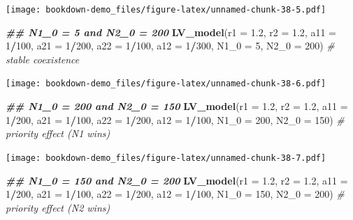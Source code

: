 \documentclass[
]{book}
\newenvironment{Shaded}{\begin{snugshade}}{\end{snugshade}}
\newcommand{\AttributeTok}[1]{\textcolor[rgb]{0.13,0.29,0.53}{#1}}
\newcommand{\CommentTok}[1]{\textcolor[rgb]{0.56,0.35,0.01}{\textit{#1}}}
\newcommand{\DecValTok}[1]{\textcolor[rgb]{0.00,0.00,0.81}{#1}}
\newcommand{\DocumentationTok}[1]{\textcolor[rgb]{0.56,0.35,0.01}{\textbf{\textit{#1}}}}
\newcommand{\FloatTok}[1]{\textcolor[rgb]{0.00,0.00,0.81}{#1}}
\newcommand{\FunctionTok}[1]{\textcolor[rgb]{0.13,0.29,0.53}{\textbf{#1}}}
\newcommand{\NormalTok}[1]{#1}
\newcommand{\SpecialCharTok}[1]{\textcolor[rgb]{0.81,0.36,0.00}{\textbf{#1}}}
\begin{document}
\texttt{[image: bookdown-demo\_files/figure-latex/unnamed-chunk-38-5.pdf]}

\begin{Shaded}
\begin{Highlighting}[]
  \DocumentationTok{\#\# N1\_0 = 5 and N2\_0 = 200}
  \FunctionTok{LV\_model}\NormalTok{(}\AttributeTok{r1 =} \FloatTok{1.2}\NormalTok{, }\AttributeTok{r2 =} \FloatTok{1.2}\NormalTok{, }\AttributeTok{a11 =} \DecValTok{1}\SpecialCharTok{/}\DecValTok{100}\NormalTok{, }\AttributeTok{a21 =} \DecValTok{1}\SpecialCharTok{/}\DecValTok{200}\NormalTok{, }\AttributeTok{a22 =} \DecValTok{1}\SpecialCharTok{/}\DecValTok{100}\NormalTok{, }\AttributeTok{a12 =} \DecValTok{1}\SpecialCharTok{/}\DecValTok{300}\NormalTok{, }\AttributeTok{N1\_0 =} \DecValTok{5}\NormalTok{, }\AttributeTok{N2\_0 =} \DecValTok{200}\NormalTok{)  }\CommentTok{\# stable coexistence}
\end{Highlighting}
\end{Shaded}

\texttt{[image: bookdown-demo\_files/figure-latex/unnamed-chunk-38-6.pdf]}

\begin{Shaded}
\begin{Highlighting}[]
  \DocumentationTok{\#\# N1\_0 = 200 and N2\_0 = 150}
  \FunctionTok{LV\_model}\NormalTok{(}\AttributeTok{r1 =} \FloatTok{1.2}\NormalTok{, }\AttributeTok{r2 =} \FloatTok{1.2}\NormalTok{, }
           \AttributeTok{a11 =} \DecValTok{1}\SpecialCharTok{/}\DecValTok{200}\NormalTok{, }\AttributeTok{a21 =} \DecValTok{1}\SpecialCharTok{/}\DecValTok{100}\NormalTok{, }\AttributeTok{a22 =} \DecValTok{1}\SpecialCharTok{/}\DecValTok{200}\NormalTok{, }\AttributeTok{a12 =} \DecValTok{1}\SpecialCharTok{/}\DecValTok{100}\NormalTok{, }
           \AttributeTok{N1\_0 =} \DecValTok{200}\NormalTok{, }\AttributeTok{N2\_0 =} \DecValTok{150}\NormalTok{)  }\CommentTok{\# priority effect (N1 wins)}
\end{Highlighting}
\end{Shaded}

\texttt{[image: bookdown-demo\_files/figure-latex/unnamed-chunk-38-7.pdf]}

\begin{Shaded}
\begin{Highlighting}[]
  \DocumentationTok{\#\# N1\_0 = 150 and N2\_0 = 200}
  \FunctionTok{LV\_model}\NormalTok{(}\AttributeTok{r1 =} \FloatTok{1.2}\NormalTok{, }\AttributeTok{r2 =} \FloatTok{1.2}\NormalTok{, }
           \AttributeTok{a11 =} \DecValTok{1}\SpecialCharTok{/}\DecValTok{200}\NormalTok{, }\AttributeTok{a21 =} \DecValTok{1}\SpecialCharTok{/}\DecValTok{100}\NormalTok{, }\AttributeTok{a22 =} \DecValTok{1}\SpecialCharTok{/}\DecValTok{200}\NormalTok{, }\AttributeTok{a12 =} \DecValTok{1}\SpecialCharTok{/}\DecValTok{100}\NormalTok{, }
           \AttributeTok{N1\_0 =} \DecValTok{150}\NormalTok{, }\AttributeTok{N2\_0 =} \DecValTok{200}\NormalTok{)  }\CommentTok{\# priority effect (N2 wins)}
\end{Highlighting}
\end{Shaded}
\end{document}
